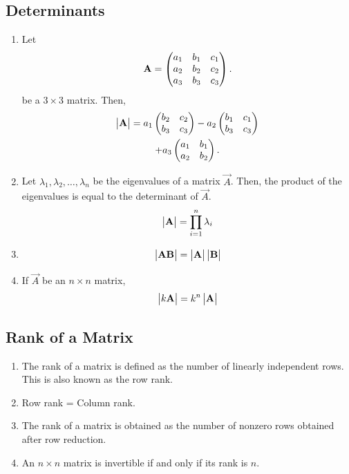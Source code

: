 \documentclass[journal,12pt,twocolumn]{IEEEtran}
\renewcommand\thesection{\arabic{section}}
\renewcommand\thesubsection{\thesection.\arabic{subsection}}
\begin{document}
\subsection{Determinants}
\renewcommand{\theequation}{\theenumi}
\begin{enumerate}[label=\thesubsection.\arabic*.,ref=\thesubsection.\theenumi]

\item Let 
\begin{align}
	\mathbf{A} = \begin{pmatrix}a_1 & b_1 & c_1  \\ a_2 & b_2 & c_2  \\ a_3 & b_3 & c_3\end{pmatrix}.
\end{align}
be a $3 \times 3$ matrix. 
Then, 
\begin{multline}
	\begin{vmatrix}\mathbf{A}\end{vmatrix} = a_1 \begin{pmatrix} b_2 & c_2 \\  b_3 & c_3\end{pmatrix} - a_2\begin{pmatrix} b_1 & c_1 \\  b_3 & c_3 \end{pmatrix}  \\ + a_3\begin{pmatrix}a_1 & b_1 \\ a_2 & b_2 \end{pmatrix}.
\end{multline}
\item Let $\lambda_1,\lambda_2, \dots, \lambda_n$ be the eigenvalues of a matrix $\vec{A}$.  Then,   the product of the eigenvalues is equal to the determinant of $\vec{A}$.
\begin{align}
	\begin{vmatrix}\mathbf{A}\end{vmatrix} = \prod_{i=1}^{n}\lambda_i
\end{align}
%
\item 
\begin{align}
	\begin{vmatrix}\mathbf{A}\mathbf{B}\end{vmatrix} = \begin{vmatrix}\mathbf{A}\end{vmatrix}\begin{vmatrix}\mathbf{B}\end{vmatrix}
\end{align}
\item If $\vec{A}$ be an $n \times n$ matrix, 
\begin{align}
	\label{eq:det_kord}
	\begin{vmatrix}k\mathbf{A}\end{vmatrix} = k^n\begin{vmatrix}\mathbf{A}\end{vmatrix}
\end{align}

\end{enumerate}
\subsection{Rank of a Matrix}
\renewcommand{\theequation}{\theenumi}
\begin{enumerate}[label=\thesubsection.\arabic*.,ref=\thesubsection.\theenumi]
\item The rank of a matrix is defined as the number of linearly independent rows.  This is also known as the row rank.
\item Row rank = Column rank.
\item The rank of a matrix is obtained as the number of nonzero rows obtained after row reduction.
\item An $n \times n$ matrix is invertible if and only if its rank is $n$.
\end{enumerate}
\end{document}
